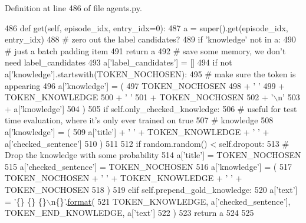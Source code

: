 Definition at line 486 of file agents.\+py.


\begin{DoxyCode}
486     \textcolor{keyword}{def }get(self, episode\_idx, entry\_idx=0):
487         a = super().get(episode\_idx, entry\_idx)
488         \textcolor{comment}{# zero out the label candidates?}
489         \textcolor{keywordflow}{if} \textcolor{stringliteral}{'knowledge'} \textcolor{keywordflow}{not} \textcolor{keywordflow}{in} a:
490             \textcolor{comment}{# just a batch padding item}
491             \textcolor{keywordflow}{return} a
492         \textcolor{comment}{# save some memory, we don't need label\_candidates}
493         a[\textcolor{stringliteral}{'label\_candidates'}] = []
494         \textcolor{keywordflow}{if} \textcolor{keywordflow}{not} a[\textcolor{stringliteral}{'knowledge'}].startswith(TOKEN\_NOCHOSEN):
495             \textcolor{comment}{# make sure the token is appearing}
496             a[\textcolor{stringliteral}{'knowledge'}] = (
497                 TOKEN\_NOCHOSEN
498                 + \textcolor{stringliteral}{' '}
499                 + TOKEN\_KNOWLEDGE
500                 + \textcolor{stringliteral}{' '}
501                 + TOKEN\_NOCHOSEN
502                 + \textcolor{stringliteral}{'\(\backslash\)n'}
503                 + a[\textcolor{stringliteral}{'knowledge'}]
504             )
505         \textcolor{keywordflow}{if} self.only\_checked\_knowledge:
506             \textcolor{comment}{# useful for test time evaluation, where it's only ever trained on true}
507             \textcolor{comment}{# knowledge}
508             a[\textcolor{stringliteral}{'knowledge'}] = (
509                 a[\textcolor{stringliteral}{'title'}] + \textcolor{stringliteral}{' '} + TOKEN\_KNOWLEDGE + \textcolor{stringliteral}{' '} + a[\textcolor{stringliteral}{'checked\_sentence'}]
510             )
511 
512         \textcolor{keywordflow}{if} random.random() < self.dropout:
513             \textcolor{comment}{# Drop the knowledge with some probability}
514             a[\textcolor{stringliteral}{'title'}] = TOKEN\_NOCHOSEN
515             a[\textcolor{stringliteral}{'checked\_sentence'}] = TOKEN\_NOCHOSEN
516             a[\textcolor{stringliteral}{'knowledge'}] = (
517                 TOKEN\_NOCHOSEN + \textcolor{stringliteral}{' '} + TOKEN\_KNOWLEDGE + \textcolor{stringliteral}{' '} + TOKEN\_NOCHOSEN
518             )
519         \textcolor{keywordflow}{elif} self.prepend\_gold\_knowledge:
520             a[\textcolor{stringliteral}{'text'}] = \textcolor{stringliteral}{'\{\} \{\} \{\}\(\backslash\)n\{\}'}.\hyperlink{namespaceparlai_1_1chat__service_1_1services_1_1messenger_1_1shared__utils_a32e2e2022b824fbaf80c747160b52a76}{format}(
521                 TOKEN\_KNOWLEDGE, a[\textcolor{stringliteral}{'checked\_sentence'}], TOKEN\_END\_KNOWLEDGE, a[\textcolor{stringliteral}{'text'}]
522             )
523         \textcolor{keywordflow}{return} a
524 
525 
\end{DoxyCode}

